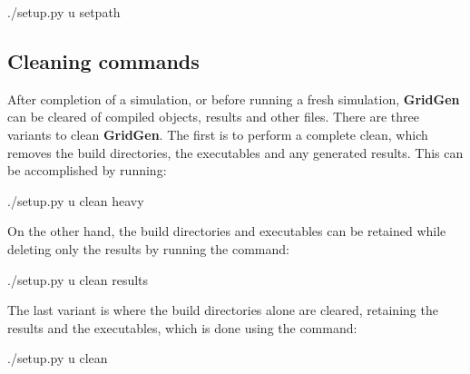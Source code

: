 \documentclass[letterpaper,10pt,english]{sphinxmanual}
\begin{document}
\begin{sphinxVerbatim}[commandchars=\\\{\}]
\PYGZdl{} ./setup.py \PYGZhy{}u set\PYGZus{}path
\end{sphinxVerbatim}


\subsection{Cleaning commands}
\label{\detokenize{gridpyfiles/compile:cleaning-commands}}
After completion of a simulation, or before running a fresh simulation, {\color{red}\bfseries{}\textbar{}GridGen\textbar{}} can be cleared of compiled objects, results and other files. There are three variants to clean {\color{red}\bfseries{}\textbar{}GridGen\textbar{}}. The first is to perform a complete clean, which removes the build directories, the executables and any generated results. This can be accomplished by running:

\begin{sphinxVerbatim}[commandchars=\\\{\}]
\PYGZdl{} ./setup.py \PYGZhy{}u clean heavy
\end{sphinxVerbatim}

On the other hand, the build directories and executables can be retained while deleting only the results by running the command:

\begin{sphinxVerbatim}[commandchars=\\\{\}]
\PYGZdl{} ./setup.py \PYGZhy{}u clean results
\end{sphinxVerbatim}

The last variant is where the build directories alone are cleared, retaining the results and the executables, which is done using the command:

\begin{sphinxVerbatim}[commandchars=\\\{\}]
\PYGZdl{} ./setup.py \PYGZhy{}u clean
\end{sphinxVerbatim}
\end{document}
